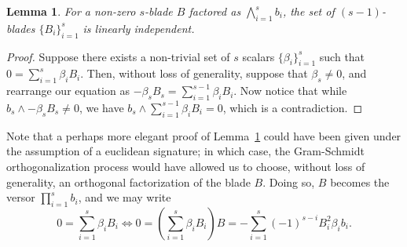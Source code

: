 \documentclass{birkjour}
\newtheorem{lem}[thm]{Lemma}
\theoremstyle{definition}
\theoremstyle{remark}
\numberwithin{equation}{section}
\begin{document}
\begin{lem}\label{lem_B_i_lin_indep}
For a non-zero $s$-blade $B$ factored as $\bigwedge_{i=1}^s b_i$, the set of
$(s-1)$-blades $\{B_i\}_{i=1}^s$ is linearly independent.
\end{lem}
\begin{proof}
Suppose there exists a non-trivial set of $s$ scalars $\{\beta_i\}_{i=1}^s$
such that $0 = \sum_{i=1}^s\beta_i B_i$.
Then, without loss of generality, suppose that $\beta_s\neq 0$, and rearrange
our equation as $-\beta_sB_s=\sum_{i=1}^{s-1}\beta_iB_i$.  Now notice
that while $b_s\wedge-\beta_sB_s\neq 0$, we have $b_s\wedge\sum_{i=1}^{s-1}\beta_iB_i=0$,
which is a contradiction.
\end{proof}

Note that a perhaps more elegant proof of Lemma~\ref{lem_B_i_lin_indep} could have been given
under the assumption
of a euclidean signature; in which case, the Gram-Schmidt orthogonalization process would have
allowed us to choose, without loss of generality, an orthogonal factorization of the blade $B$.
Doing so, $B$ becomes the versor $\prod_{i=1}^s b_i$, and we may write
\begin{equation*}
0 = \sum_{i=1}^s \beta_iB_i \iff
0=\left(\sum_{i=1}^s\beta_iB_i\right)B = -\sum_{i=1}^s(-1)^{s-i}B_i^2\beta_ib_i.
\end{equation*}



\begin{thebibliography}{9}

\end{thebibliography}
\end{document}
